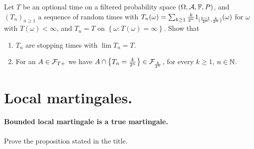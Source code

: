  Let $T$ be an
optional time on a filtered probability space $(\Omega, \mathcal A, \mathbb F, P)$, and
$\left( T_n \right)_{n\geq 1}$ a sequence of random times with $T_n(\omega) =
\sum_{k\geq 1} \frac{k}{2^n} 1_{ [ \frac{k-1}{2^n}, \frac{k}{2^n} ) }(\omega)$ for
$\omega$ with $T(\omega)<\infty$, and $T_n=T$ on $\left\{ \omega : T(\omega)=\infty \right\}$.
Show that
\begin{enumerate}
    \item $T_n$ are stopping times with $\lim T_n = T$. 
    \item For an $A\in \mathcal F_{T+}$ we have $A \cap \left\{ T_n = \frac{k}{2^n} \right\} \in \mathcal F_{\frac{k}{2^n}}$,
        for every $k\geq 1$, $n\in\mathbb N$.
\end{enumerate}


\section{Local martingales. }

\paragraph{Bounded local martingale is a true martingale.} Prove the proposition 
stated in the title. 




